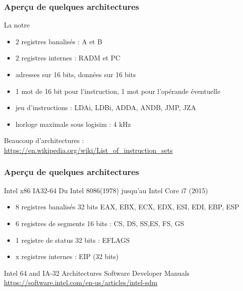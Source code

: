\documentclass{beamer}
\begin{document}
\begin{frame}
  \frametitle{Aperçu de quelques architectures}
  \begin{block}{La notre}
    \begin{itemize}
    \item 2 registres banalisés : A et B
    \item 2 registres internes : RADM et PC
    \item adresses sur 16 bits, données sur 16 bits
    \item 1 mot de 16 bit pour l'instruction, 1 mot pour l'opérande éventuelle
    \item jeu d'instructions : LDAi, LDBi, ADDA, ANDB, JMP, JZA
    \item horloge maximale sous logisim : 4 kHz
    \end{itemize}
  \end{block}
  Beaucoup d'architectures :\\\url{https://en.wikipedia.org/wiki/List_of_instruction_sets}
\end{frame}

\begin{frame}
  \frametitle{Aperçu de quelques architectures}
  \begin{block}{Intel x86 IA32-64}
    Du Intel 8086(1978) jusqu'au Intel Core i7 (2015)
    \begin{itemize}
    \item 8 registres banalisés 32 bits EAX, EBX, ECX, EDX, ESI, EDI, EBP, ESP
    \item 6 registres de segments 16 bits : CS, DS, SS,ES, FS, GS
    \item 1 registre de status 32 bits : EFLAGS
    \item x registres internes : EIP (32 bits)
    \end{itemize}
  \end{block}
  \begin{small}
  Intel 64 and IA-32 Architectures Software Developer Manuals \url{https://software.intel.com/en-us/articles/intel-sdm}\end{small}
\end{frame}
\end{document}
